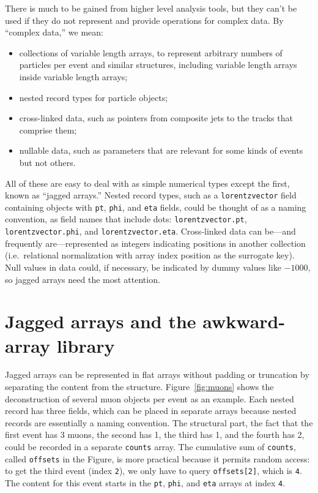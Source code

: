 \documentclass[a4paper]{jpconf}
\begin{document}
There is much to be gained from higher level analysis tools, but they can't be used if they do not represent and provide operations for complex data. By ``complex data,'' we mean:
\begin{itemize}
\item collections of variable length arrays, to represent arbitrary numbers of particles per event and similar structures, including variable length arrays inside variable length arrays;
\item nested record types for particle objects;
\item cross-linked data, such as pointers from composite jets to the tracks that comprise them;
\item nullable data, such as parameters that are relevant for some kinds of events but not others.
\end{itemize}

All of these are easy to deal with as simple numerical types except the first, known as ``jagged arrays.'' Nested record types, such as a {\tt lorentzvector} field containing objects with {\tt pt}, {\tt phi}, and {\tt eta} fields, could be thought of as a naming convention, as field names that include dots: {\tt lorentzvector.pt}, {\tt lorentzvector.phi}, and {\tt lorentzvector.eta}. Cross-linked data can be---and frequently are---represented as integers indicating positions in another collection (i.e.\ relational normalization with array index position as the surrogate key). Null values in data could, if necessary, be indicated by dummy values like $-1000$, so jagged arrays need the most attention.

\section{Jagged arrays and the awkward-array library}

Jagged arrays can be represented in flat arrays without padding or truncation by separating the content from the structure. Figure~\ref{fig:muons} shows the deconstruction of several muon objects per event as an example. Each nested record has three fields, which can be placed in separate arrays because nested records are essentially a naming convention. The structural part, the fact that the first event has 3 muons, the second has 1, the third has 1, and the fourth has 2, could be recorded in a separate {\tt counts} array. The cumulative sum of {\tt counts}, called {\tt offsets} in the Figure, is more practical because it permits random access: to get the third event (index {\tt 2}), we only have to query {\tt offsets[2]}, which is {\tt 4}. The content for this event starts in the {\tt pt}, {\tt phi}, and {\tt eta} arrays at index {\tt 4}.
\end{document}
